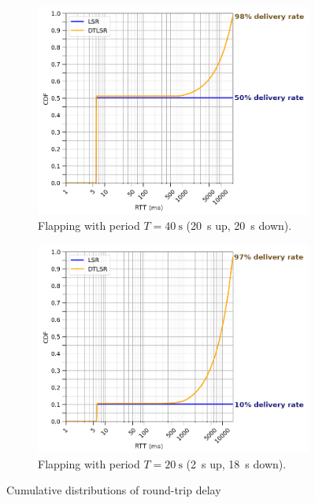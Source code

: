 \documentclass[withindex,glossary,openany]{cam-thesis}
\begin{document}
\begin{figure}
\centering
\begin{subfigure}{.8\textwidth}
  \centering
  \hspace*{1.1cm}
  \includegraphics[width=1\linewidth]{delay_partition_flap20}
  \caption{Flapping with period $T=\SI{40}{\s}$ (\SI{20}{\s} up, \SI{20}{\s} down).}
  \label{fig:partition_20}
\end{subfigure}

\begin{subfigure}{.8\textwidth}
  \centering
  \hspace*{1.1cm}
  \includegraphics[width=1\linewidth]{delay_partition_flap2_18}
  \caption{Flapping with period $T=\SI{20}{\s}$ (\SI{2}{\s} up, \SI{18}{\s} down).}
  \label{fig:partition_2_18}
\end{subfigure}

\caption{Cumulative distributions of round-trip delay}
\label{fig:partition}
\end{figure}
\end{document}
